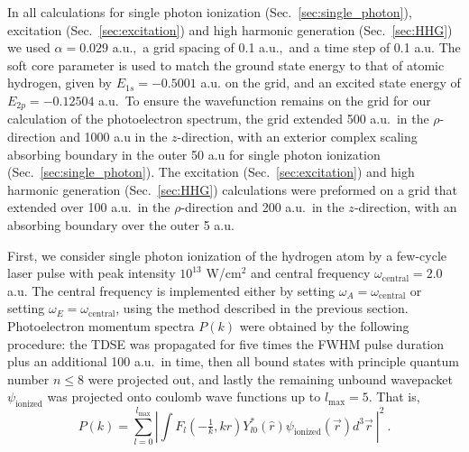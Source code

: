 In all calculations for single photon ionization (Sec.~\ref{sec:single_photon}), excitation (Sec.~\ref{sec:excitation}) and high harmonic generation (Sec.~\ref{sec:HHG}) we used $\alpha=0.029$ a.u.,\ a grid spacing of 0.1 a.u.,\ and a time step of 0.1 a.u. The soft core parameter is used to match the ground state energy to that of atomic hydrogen, given by $E_{1s} = -0.5001$ a.u. on the grid, and an excited state energy of $E_{2p} = -0.12504$ a.u.\  To ensure the wavefunction remains on the grid for our calculation of the photoelectron spectrum, the grid extended 500 a.u.\  in the $\rho$-direction and 1000 a.u in the $z$-direction, with an exterior complex scaling absorbing boundary in the outer 50 a.u for single photon ionization (Sec.~\ref{sec:single_photon}). The excitation (Sec.~\ref{sec:excitation}) and high harmonic generation (Sec.~\ref{sec:HHG}) calculations were preformed on a grid that extended over 100 a.u.\  in the $\rho$-direction and 200 a.u.\ in the $z$-direction, with an absorbing boundary over the outer 5 a.u.

First, we consider single photon ionization of the hydrogen atom by a few-cycle laser pulse with peak intensity $10^{13}$ W/cm$^2$ and central frequency $\omega_{\text{central}} = 2.0$ a.u. The central frequency is implemented either by setting $\omega_A=\omega_{\text{central}}$ or setting $\omega_E=\omega_{\text{central}}$, using the method described in the previous section. Photoelectron momentum spectra $P(k)$ were obtained by the following procedure: the TDSE was propagated for five times the FWHM pulse duration plus an additional 100 a.u.\  in time, then all bound states with principle quantum number $n\le 8$ were projected out, and lastly the remaining unbound wavepacket $\psi_{\text{ionized}}$ was projected onto coulomb wave functions up to $l_{\text{max}}=5$. That is,
%
\begin{equation}
P(k) = \sum_{l=0}^{l_{\text{max}}} \left|\int F_{l}(-\tfrac{1}{k}, kr)Y^*_{l0}(\hat{r})\psi_{\text{ionized}}(\vec{r})d^{3}\vec{r}~\right|^2 ~.
\end{equation}



